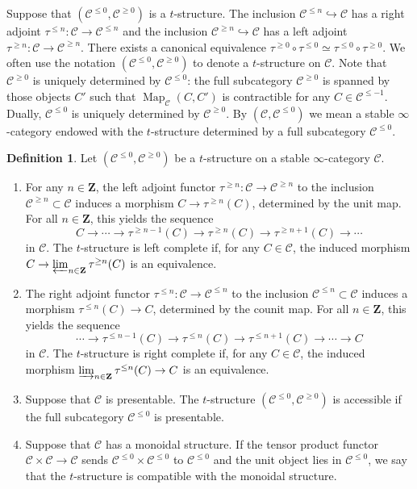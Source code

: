 \documentclass[leqno,12pt]{amsart}
\theoremstyle{plain}
\theoremstyle{definition}
\newtheorem{Definition}[Theorem]{Definition}
\newcommand{\ZZ}{\mathbf{Z}}
\newcommand{\CCC}{\mathcal{C}}
\newcommand{\Map}{\operatorname{Map}}
\begin{document}
Suppose that $(\CCC^{\le0},\CCC^{\ge0})$ is a $t$-structure.
The inclusion $\CCC^{\le n}\hookrightarrow\CCC$ has a right adjoint 
$\tau^{\le n}:\CCC\longrightarrow \CCC^{\le n}$
and the inclusion $\CCC^{\ge n}\hookrightarrow\CCC$
has a left adjoint $\tau^{\ge n}:\CCC\longrightarrow \CCC^{\ge n}$.
There exists a canonical equivalence $\tau^{\ge 0}\circ \tau^{\le0}\simeq \tau^{\le 0}\circ \tau^{\ge0}$.
We often use the notation $(\CCC^{\le0}, \CCC^{\ge0})$ to denote a $t$-structure on $\CCC$.
Note that $\CCC^{\ge0}$ is uniquely determined by $\CCC^{\le0}$: the full subcategory $\CCC^{\ge0}$ is spanned by those objects $C'$ such that $\Map_{\CCC}(C,C')$ is contractible for any $C\in \CCC^{\le -1}$. Dually, $\CCC^{\le0}$ is uniquely determined by $\CCC^{\ge0}$.
By $(\CCC,\CCC^{\le0})$ we mean a stable $\infty$-category endowed with the $t$-structure determined by a full subcategory $\CCC^{\le0}$.



\begin{Definition}
Let $(\CCC^{\le 0}, \CCC^{\ge 0})$ be a $t$-structure on a stable $\infty$-category $\CCC$.
\begin{enumerate}
\item For any $n \in \ZZ$, the left adjoint functor $\tau^{\ge n}: \CCC \to \CCC^{\ge n}$ to the inclusion
$\CCC^{\ge n} \subset \CCC$ induces a morphism $C \to \tau^{\ge n}(C)$, determined by the unit map. For all $n \in \ZZ$, this yields the sequence
\[
C \to \cdots \to \tau^{\ge n-1}(C) \to \tau^{\ge n}(C) \to \tau^{\ge n+1}(C) \to \cdots
\]
in $\CCC$.
The $t$-structure is left complete if, for any $C \in \CCC$, the induced morphism $C \to \varprojlim_{n \in \ZZ} \tau^{\ge n}(C)$ is an equivalence.
\item The right adjoint functor $\tau^{\le n}: \CCC \to \CCC^{\le n}$ to the inclusion
$\CCC^{\le n} \subset \CCC$ induces a morphism $\tau^{\le n}(C) \to C$, determined by the counit map. For all $n \in \ZZ$, this yields the sequence
\[
\cdots \to \tau^{\le n-1}(C) \to \tau^{\le n}(C) \to \tau^{\le n+1}(C) \to \cdots \to C
\]
in $\CCC$.
The $t$-structure is right complete if, for any $C \in \CCC$, the induced morphism $\varinjlim_{n \in \ZZ} \tau^{\le n}(C) \to C$ is an equivalence.

\item Suppose that $\CCC$ is presentable. The $t$-structure $(\CCC^{\le 0}, \CCC^{\ge 0})$ is accessible if the full subcategory $\CCC^{\le 0}$ is presentable.
\item Suppose that $\CCC$ has a monoidal structure. If the tensor product functor $\CCC \times \CCC \to \CCC$ sends $\CCC^{\le 0} \times \CCC^{\le 0}$ to $\CCC^{\le 0}$ and the unit object lies in $\CCC^{\le 0}$, we say that the $t$-structure is compatible with the monoidal structure.
\end{enumerate}
\end{Definition}
\end{document}
